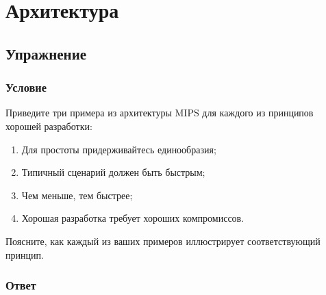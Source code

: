 \documentclass[12pt]{article}
\newenvironment{e}[1][dummy label]{
    \subsection{Упражнение}\label{#1}
    \subsubsection*{Условие}
    }{
    \subsubsection*{Ответ}
}
\begin{document}
    \setcounter{section}{5}
    \section{Архитектура}

    \begin{e}
        Приведите три примера из архитектуры MIPS для каждого из принципов хорошей разработки:
        \begin{enumerate}
            \item Для простоты придерживайтесь единообразия;
            \item Типичный сценарий должен быть быстрым;
            \item Чем меньше, тем быстрее;
            \item Хорошая разработка требует хороших компромиссов.
        \end{enumerate}

        Поясните, как каждый из ваших примеров иллюстрирует соответствующий принцип.
    \end{e}
\end{document}
